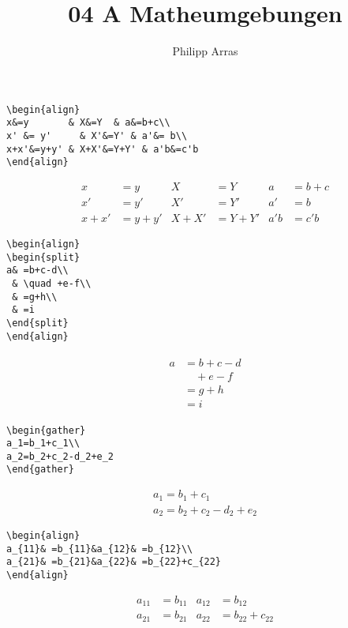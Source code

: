 \documentclass[11pt,a4paper]{scrartcl}
\author{Philipp Arras}
\title{04 A Matheumgebungen}
\begin{document}
\maketitle

\begin{lstlisting}
\begin{align}
x&=y       & X&=Y  & a&=b+c\\
x' &= y'     & X'&=Y' & a'&= b\\
x+x'&=y+y' & X+X'&=Y+Y' & a'b&=c'b
\end{align}
\end{lstlisting}
\begin{align}
x&=y       & X&=Y  & a&=b+c\\
x' &= y'     & X'&=Y' & a'&= b\\
x+x'&=y+y' & X+X'&=Y+Y' & a'b&=c'b
\end{align}

\begin{lstlisting}
\begin{align}
\begin{split}
a& =b+c-d\\
 & \quad +e-f\\
 & =g+h\\
 & =i
\end{split}
\end{align}
\end{lstlisting}
\begin{align}
\begin{split}
a& =b+c-d\\
 & \quad +e-f\\
 & =g+h\\
 & =i
\end{split}
\end{align}

\begin{lstlisting}
\begin{gather}
a_1=b_1+c_1\\
a_2=b_2+c_2-d_2+e_2
\end{gather}
\end{lstlisting}
\begin{gather}
a_1=b_1+c_1\\
a_2=b_2+c_2-d_2+e_2
\end{gather}

\begin{lstlisting}
\begin{align}
a_{11}& =b_{11}&a_{12}& =b_{12}\\
a_{21}& =b_{21}&a_{22}& =b_{22}+c_{22}
\end{align}
\end{lstlisting}
\begin{align}
a_{11}& =b_{11}&a_{12}& =b_{12}\\
a_{21}& =b_{21}&a_{22}& =b_{22}+c_{22}
\end{align}
\end{document}
